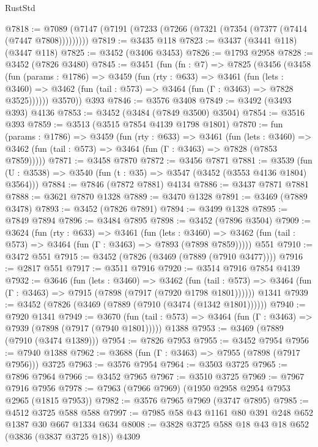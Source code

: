 \begin{lexlean}{RustStd}
\begin{coremodule}
@7818 := @7089 (@7147 (@7191 (@7233 (@7266 (@7321 (@7354 (@7377 (@7414 (@7447 @7808)))))))))
@7819 := @3435 @118
@7823 := @3437 (@3441 @118) (@3447 @118)
@7825 := @3452 (@3406 @3453)
@7826 := @1793 @2958
@7828 := @3452 (@7826 @3480)
@7845 := @3451
    (fun (fn : @7) =>
    @7825
      (@3456
        (@3458
          (fun (params : @1786) =>
          @3459
            (fun (rty : @633) =>
            @3461
              (fun (lets : @3460) =>
              @3462 (fun (tail : @573) => @3464 (fun (Γ : @3463) => @7828 @3525))))))
        @3570))
    @393
@7846 := @3576 @3408
@7849 := @3492 (@3493 @393) @4136
@7853 := @3452 (@3484 (@7849 @3500) @3504)
@7854 := @3516 @393
@7859 := @3513 (@3515 @7854 @4139 @1798 @1801)
@7870 := fun (params : @1786) =>
  @3459
    (fun (rty : @633) =>
    @3461
      (fun (lets : @3460) =>
      @3462 (fun (tail : @573) => @3464 (fun (Γ : @3463) => @7828 (@7853 @7859)))))
@7871 := @3458 @7870
@7872 := @3456 @7871
@7881 := @3539 (fun (U : @3538) => @3540 (fun (t : @35) => @3547 (@3452 (@3553 @4136 @1804) @3564)))
@7884 := @7846 (@7872 @7881) @4134
@7886 := @3437 @7871 @7881
@7888 := @3621 @7870 @1328
@7889 := @3470 @1328
@7891 := @3469 (@7889 @3478)
@7893 := @3452 (@7826 @7891)
@7894 := @3499 @1328
@7895 := @7849 @7894
@7896 := @3484 @7895
@7898 := @3452 (@7896 @3504)
@7909 := @3624
    (fun (rty : @633) =>
    @3461
      (fun (lets : @3460) =>
      @3462 (fun (tail : @573) => @3464 (fun (Γ : @3463) => @7893 (@7898 @7859)))))
    @551
@7910 := @3472 @551
@7915 := @3452 (@7826 (@3469 (@7889 (@7910 @3477))))
@7916 := @2817 @551
@7917 := @3511 @7916
@7920 := @3514 @7916 @7854 @4139
@7932 := @3646
    (fun (lets : @3460) =>
    @3462
      (fun (tail : @573) => @3464 (fun (Γ : @3463) => @7915 (@7898 (@7917 (@7920 @1798 @1801))))))
    @1341
@7939 := @3452 (@7826 (@3469 (@7889 (@7910 (@3474 (@1342 @1801))))))
@7940 := @7920 @1341
@7949 := @3670
    (fun (tail : @573) => @3464 (fun (Γ : @3463) => @7939 (@7898 (@7917 (@7940 @1801)))))
    @1388
@7953 := @3469 (@7889 (@7910 (@3474 @1389)))
@7954 := @7826 @7953
@7955 := @3452 @7954
@7956 := @7940 @1388
@7962 := @3688 (fun (Γ : @3463) => @7955 (@7898 (@7917 @7956))) @3725
@7963 := @3576 @7954
@7964 := @3503 @3725
@7965 := @7896 @7964
@7966 := @3452 @7965
@7967 := @3510 @3725
@7969 := @7967 @7916 @7956
@7978 := @7963 (@7966 @7969) (@1950 @2958 @2954 @7953 @2965 (@1815 @7953))
@7982 := @3576 @7965 @7969 (@3747 @7895)
@7985 := @4512 @3725 @588 @588
@7997 := @7985 @58 @43 @1161 @80 @391 @248 @652 @1387 @30 @667 @1334 @634
@8008 := @3828 @3725 @588 @18 @43 @18 @652 (@3836 (@3837 @3725 @18)) @4309

\end{coremodule}
\end{lexlean}
